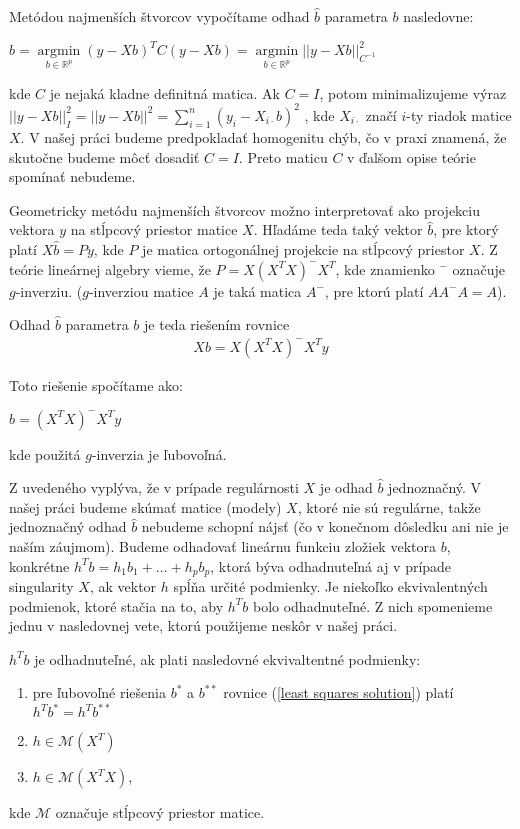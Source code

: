 Metódou najmenších štvorcov vypočítame odhad $\hat{b}$ parametra $b$ nasledovne:

\begin{center}
$
\hat{b} = \underset{b \in \mathbb{R}^{p}}{\operatorname{arg min}} (y - Xb)^T C (y - Xb) =
\underset{b \in \mathbb{R}^{p}}{\operatorname{arg min}} ||y - Xb||_{C^{-1}}^2
$
\end{center}

kde $C$ je nejaká kladne definitná matica. 
Ak $C = I$, potom minimalizujeme výraz
$||y - Xb||_I^2 = ||y - Xb||^2 = \sum_{i=1}^n (y_i - X_{i \cdot } b)^2$
, kde $X_{i \cdot }$ značí $i$-ty riadok matice $X$.
V našej práci budeme predpokladať homogenitu chýb, čo v praxi znamená,
že skutočne budeme môcť dosadiť $C = I$.
Preto maticu $C$ v ďalšom opise teórie spomínať nebudeme.

Geometricky metódu najmenších štvorcov možno interpretovať ako projekciu vektora $y$ 
na stĺpcový priestor matice $X$. Hľadáme teda taký vektor $\hat{b}$, 
pre ktorý platí $X \hat{b} = Py$, kde $P$ je matica ortogonálnej projekcie na stĺpcový priestor $X$. 
Z teórie lineárnej algebry vieme, že $P = X (X^T X)^- X^T$, kde znamienko $^-$ označuje $g$-inverziu.
($g$-inverziou matice $A$ je taká matica $A^-$, pre ktorú platí $A A^- A = A$).

Odhad $\hat{b}$ parametra $b$ je teda riešením rovnice
\begin{align}
\label{least squares solution}
X b =  X (X^T X)^- X^T y
\end{align}

Toto riešenie spočítame ako:

\begin{center}
$
\hat{b} = (X^T X)^- X^T y
$
\end{center}
kde použitá $g$-inverzia je ľubovoľná.

Z uvedeného vyplýva, že v prípade regulárnosti $X$ je odhad $\hat{b}$ jednoznačný. 
V našej práci budeme skúmať matice (modely) $X$, ktoré nie sú regulárne, 
takže jednoznačný odhad $\hat{b}$ nebudeme schopní nájsť (čo v konečnom dôsledku ani nie je naším záujmom).
Budeme odhadovať lineárnu funkciu zložiek vektora $b$, konkrétne $h^T b = h_1 b_1 + \ldots + h_p b_p$,
ktorá býva odhadnuteľná aj v prípade singularity $X$, ak vektor $h$ spĺňa určité podmienky. 
Je niekoľko ekvivalentných podmienok, ktoré stačia na to, aby $h^T b$ bolo odhadnuteľné. 
Z nich spomenieme jednu v nasledovnej vete, ktorú použijeme neskôr v našej práci.

\begin{theorem}
\label{veta1}
$h^T b$ je odhadnuteľné, ak plati nasledovné ekvivaltentné podmienky:
\begin{enumerate}
  \item pre ľubovoľné riešenia $b^*$ a $b^{**}$ rovnice (\ref{least squares solution}) platí $h^T b^* = h^T b^{**}$
  \item $h \in \mathcal{M}(X^T)$
  \item $h \in \mathcal{M}(X^T X)$,
\end{enumerate}
kde $\mathcal{M}$ označuje stĺpcový priestor matice.
\end{theorem}

